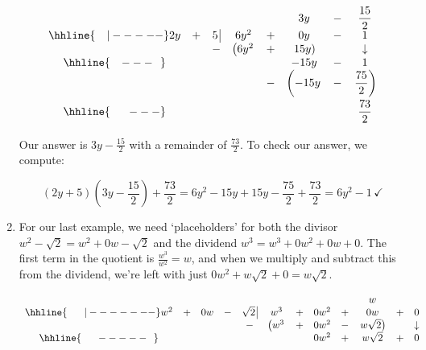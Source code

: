 \begin{ex}
\begin{enumerate}
\[\begin{array}{cccccccc}
& & & & & 3y & - & \dfrac{15}{2}  \\ \hhline{~~~|-----}

2y& + & 5 \, \vline& 6y^2 & + & 0y & - & 1  \\

 &  &  -& \left(6y^2 \right. & + & \left.  15y\right) &  & \downarrow  \\ \hhline{~~~---~~} 
 &  &  &   &  & -15y & - & 1  \\ 
 &  &  &   & - & \left(-15y\vphantom{\dfrac{75}{2}} \right. & - & \left. \dfrac{75}{2} \right) \\ \hhline{~~~~~---} 
 &  &  &   &   &  & & \dfrac{73}{2} \vphantom{\sqrt{\dfrac{73}{2}}}\\
 
\end{array}\]
\setlength\arraycolsep{5pt}
\setlength\extrarowheight{0pt}
 
Our answer is $3y - \frac{15}{2}$ with a remainder of $\frac{73}{2}$.  To check our answer, we compute:

\[ (2y + 5)\left(3y - \dfrac{15}{2}\right) + \dfrac{73}{2} = 6y^2 - 15y + 15y - \dfrac{75}{2} + \dfrac{73}{2} = 6y^2 - 1 \, \checkmark\]


\item For our last example, we need `placeholders' for both the divisor  $w^2 - \sqrt{2} = w^2 + 0w -\sqrt{2}$ and the dividend $w^3 = w^3 + 0w^2 + 0w + 0$.  The first term in the quotient is $\frac{w^3}{w^2} = w$, and when we multiply and subtract this from the dividend, we're left with just $0w^2 + w\sqrt{2} + 0 = w\sqrt{2}$.

\setlength\arraycolsep{0.1pt}
\setlength\extrarowheight{2pt}

\[ \begin{array}{cccccccccccc}

    &   &    &   &                    &     &   &      &   &  w &   & \\ \hhline{~~~~~|-------}

w^2 & + & 0w & - & \sqrt{2} \, \vline & w^3 & + & 0w^2 & + & 0w & + & 0  \\
    
		&   &    &    &                  -&\left(w^3\vphantom{w\sqrt{2}} \right. & + & 0w^2 & - & \left.  w\sqrt{2} \right) & & \downarrow \\ \hhline{~~~~~-----~~}
    &   &    &    &                   &                                       &  &  0w^2     &  + &   w\sqrt{2}  & + & 0\\ 
 

\end{array}\]
\end{enumerate}
\end{ex}
